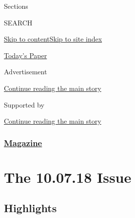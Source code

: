 Sections

SEARCH

\protect\hyperlink{site-content}{Skip to
content}\protect\hyperlink{site-index}{Skip to site index}

\href{https://myaccount.nytimes3xbfgragh.onion/auth/login?response_type=cookie\&client_id=vi}{}

\href{https://www.nytimes3xbfgragh.onion/section/todayspaper}{Today's
Paper}

Advertisement

\protect\hyperlink{after-top}{Continue reading the main story}

Supported by

\protect\hyperlink{after-sponsor}{Continue reading the main story}

\hypertarget{magazine}{%
\subsubsection{\texorpdfstring{\href{/section/magazine}{Magazine}}{Magazine}}\label{magazine}}

\hypertarget{the-100718-issue}{%
\section{The 10.07.18 Issue}\label{the-100718-issue}}

\hypertarget{highlights}{%
\subsection{Highlights}\label{highlights}}

